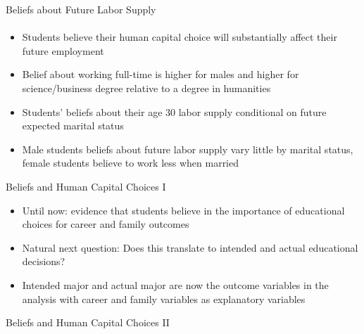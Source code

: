 \documentclass[12pt]{beamer}
\begin{document}
\begin{frame}{Beliefs about Future Labor Supply}
    \framesubtitle{} 
    \begin{itemize}
        \item Students believe their human capital choice will substantially affect their future employment
        \item Belief about working full-time is higher for males and higher for science/business degree relative to a degree in humanities
        \item Students' beliefs about their age 30 labor supply conditional on future expected marital status
        \item Male students beliefs about future labor supply vary little by marital status, female students believe to work less when married
    \end{itemize}
\end{frame}

\begin{frame}{Beliefs and Human Capital Choices I}
    \begin{itemize}
        \item Until now: evidence that students believe in the importance of educational choices for career and family outcomes
        \item Natural next question: Does this translate to intended and actual educational decisions?
        \item Intended major and actual major are now the outcome variables in the analysis with career and family variables as explanatory variables
    \end{itemize}  
\end{frame}

\begin{frame}{Beliefs and Human Capital Choices II}
     \begin{center}
    \end{center}
\end{frame}
\end{document}
